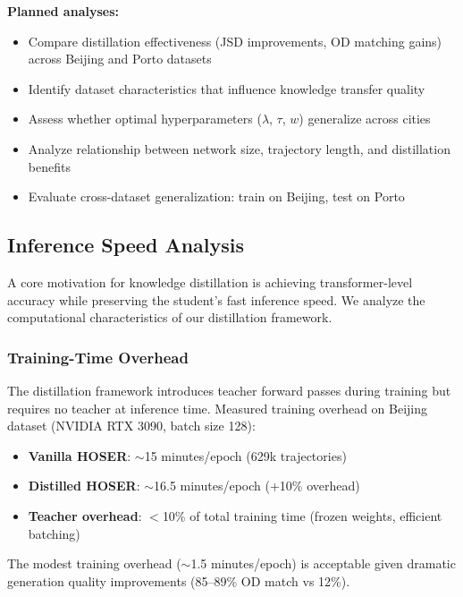 \textbf{Planned analyses:}
\begin{itemize}[noitemsep,topsep=0pt]
    \item Compare distillation effectiveness (JSD improvements, OD matching gains) across Beijing and Porto datasets
    \item Identify dataset characteristics that influence knowledge transfer quality
    \item Assess whether optimal hyperparameters ($\lambda$, $\tau$, $w$) generalize across cities
    \item Analyze relationship between network size, trajectory length, and distillation benefits
    \item Evaluate cross-dataset generalization: train on Beijing, test on Porto
\end{itemize}

\subsection{Inference Speed Analysis}
\label{sec:eval-inference}

A core motivation for knowledge distillation is achieving transformer-level accuracy while preserving the student's fast inference speed. We analyze the computational characteristics of our distillation framework.

\subsubsection{Training-Time Overhead}

The distillation framework introduces teacher forward passes during training but requires no teacher at inference time. Measured training overhead on Beijing dataset (NVIDIA RTX 3090, batch size 128):

\begin{itemize}[noitemsep,topsep=0pt]
    \item \textbf{Vanilla HOSER}: $\sim$15 minutes/epoch (629k trajectories)
    \item \textbf{Distilled HOSER}: $\sim$16.5 minutes/epoch (+10\% overhead)
    \item \textbf{Teacher overhead}: $<$10\% of total training time (frozen weights, efficient batching)
\end{itemize}

The modest training overhead ($\sim$1.5 minutes/epoch) is acceptable given dramatic generation quality improvements (85--89\% OD match vs 12\%).

